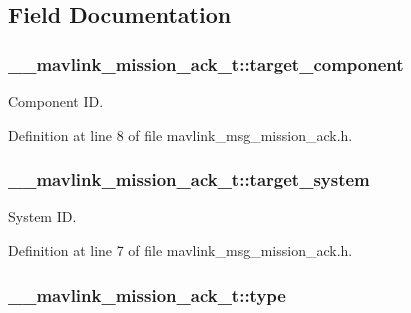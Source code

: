 \subsection{Field Documentation}
\hypertarget{struct____mavlink__mission__ack__t_ab254af31fbc3e92ab8cffcea8bd78fba}{
\subsubsection[{target\-\_\-component}]{ \-\_\-\-\_\-mavlink\-\_\-mission\-\_\-ack\-\_\-t\-::target\-\_\-component}}\label{struct____mavlink__mission__ack__t_ab254af31fbc3e92ab8cffcea8bd78fba}


Component I\-D. 



Definition at line 8 of file mavlink\-\_\-msg\-\_\-mission\-\_\-ack.\-h.

\hypertarget{struct____mavlink__mission__ack__t_ab8ef2eb9bff8975de92406b94c18d907}{
\subsubsection[{target\-\_\-system}]{ \-\_\-\-\_\-mavlink\-\_\-mission\-\_\-ack\-\_\-t\-::target\-\_\-system}}\label{struct____mavlink__mission__ack__t_ab8ef2eb9bff8975de92406b94c18d907}


System I\-D. 



Definition at line 7 of file mavlink\-\_\-msg\-\_\-mission\-\_\-ack.\-h.

\hypertarget{struct____mavlink__mission__ack__t_ad05f998d3b1bea0480eb25dcb82e0c92}{
\subsubsection[{type}]{ \-\_\-\-\_\-mavlink\-\_\-mission\-\_\-ack\-\_\-t\-::type}}\label{struct____mavlink__mission__ack__t_ad05f998d3b1bea0480eb25dcb82e0c92}


